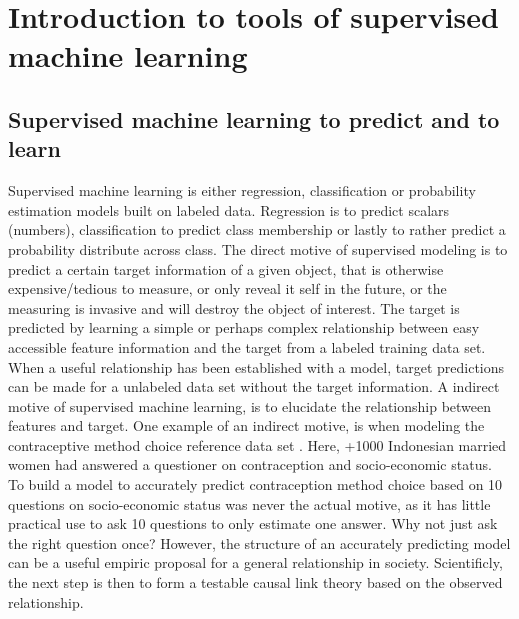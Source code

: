 \chapter{Introduction to tools of supervised machine learning}

\section{Supervised machine learning to predict and to learn}
Supervised machine learning is either regression, classification or probability estimation models built on labeled data. Regression is to predict scalars (numbers), classification to predict class membership or lastly to rather predict a probability distribute across class. The direct motive of supervised modeling is to predict a certain target information of a given object, that is otherwise expensive/tedious to measure, or only reveal it self in the future, or the measuring is invasive and will destroy the object of interest. The target is predicted by learning a simple or perhaps complex relationship between easy accessible feature information and the target from a labeled training data set. When a useful relationship has been established with a model, target predictions can be made for a unlabeled data set without the target information. A indirect motive of supervised machine learning, is to elucidate the relationship between features and target. One example of an indirect motive, is when modeling the contraceptive method choice reference data set \cite{welling2016forest,lichman2013uci}. Here, +1000 Indonesian married women had answered a questioner on contraception and socio-economic status. To build a model to accurately predict contraception method choice based on 10 questions on socio-economic status was never the actual motive, as it has little practical use to ask 10 questions to only estimate one answer. Why not just ask the right question once? However, the structure of an accurately predicting model can be a useful empiric proposal for a general relationship in society. Scientificly, the next step is then to form a testable causal link theory based on the observed relationship.

